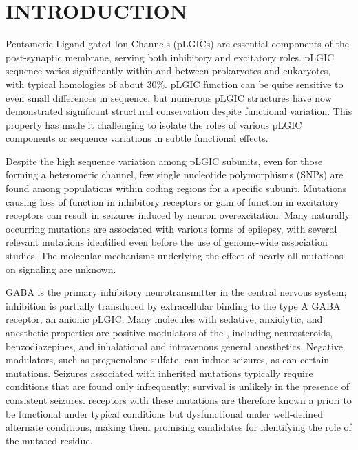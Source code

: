 \documentclass[12pt,onecolumn]{biophys}
\begin{document}
\section*{INTRODUCTION}
\newcommand{\WT}{WT\xspace}
\newcommand{\MT}{K289M\xspace}
\newcommand{\RMSD}{RMSD\textsubscript{symm}\xspace}
\newcommand{\WTs}{WT systems\xspace}
\newcommand{\MTs}{K289M systems\xspace}
\newcommand{\RMSDs}{RMSDs\textsubscript{symm}\xspace}

  Pentameric Ligand-gated Ion Channels (pLGICs) are essential components of the post-synaptic membrane, serving both inhibitory and excitatory roles.  pLGIC sequence varies significantly within and between prokaryotes and eukaryotes,\cite{Jaiteh2016} with typical homologies of about 30\%.  pLGIC function can be quite sensitive to even small differences in sequence, but numerous pLGIC structures have now demonstrated significant structural conservation despite functional variation.  This property has made it challenging to isolate the roles of various pLGIC components or sequence variations in subtle functional effects.  
    
  Despite the high sequence variation among pLGIC subunits, even for those forming a heteromeric channel, few single nucleotide polymorphisms (SNPs) are found among populations within coding regions for a specific subunit.   Mutations causing loss of function in inhibitory receptors or gain of function in excitatory receptors can result in seizures induced by neuron overexcitation. Many naturally occurring mutations are associated with various forms of epilepsy\cite{Bianchi2002,Cossette2002,Kang2004,Macdonald2004}, with several relevant mutations identified even before the use of genome-wide association studies. The molecular mechanisms underlying the effect of nearly all mutations on signaling are unknown.

GABA is the primary inhibitory neurotransmitter in the central nervous system; inhibition is partially transduced by extracellular binding to the type A GABA receptor, an anionic pLGIC\cite{Olsen1990,Macdonald1994,Rabow1995}. Many molecules with sedative, anxiolytic, and anesthetic properties are positive modulators of the \GABAA, including neurosteroids\cite {Mihic1997,Belelli2005a, Mitchell2008,Lambert2009,Olsen2011a}, benzodiazepines\cite{Sigel1997}, and inhalational and intravenous general anesthetics\cite {Krasowski1999,Harris1995,Miller2002}. Negative modulators, such as pregnenolone sulfate\cite{Majewska1988}, can induce seizures, as can certain mutations. Seizures associated with inherited mutations typically require conditions that are found only infrequently; survival is unlikely in the presence of consistent seizures.  \GABAA receptors with these mutations are therefore known a priori to be functional under typical conditions but dysfunctional under well-defined alternate conditions, making them promising candidates for identifying the role of the mutated residue.   
\end{document}
